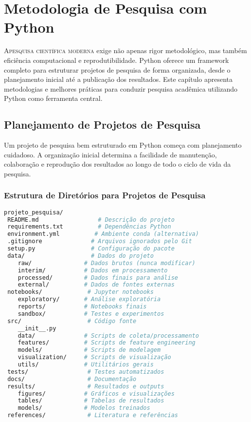 
\chapter{Metodologia de Pesquisa com Python}

\lettrine{A}{pesquisa científica moderna} exige não apenas rigor metodológico, mas também eficiência computacional e reprodutibilidade. Python oferece um framework completo para estruturar projetos de pesquisa de forma organizada, desde o planejamento inicial até a publicação dos resultados. Este capítulo apresenta metodologias e melhores práticas para conduzir pesquisa acadêmica utilizando Python como ferramenta central.

\section{Planejamento de Projetos de Pesquisa}

Um projeto de pesquisa bem estruturado em Python começa com planejamento cuidadoso. A organização inicial determina a facilidade de manutenção, colaboração e reprodução dos resultados ao longo de todo o ciclo de vida da pesquisa.

\subsection{Estrutura de Diretórios para Projetos de Pesquisa}
\begin{pythonbox}
\begin{lstlisting}[language=bash]
projeto_pesquisa/
 README.md                 # Descrição do projeto
 requirements.txt          # Dependências Python
 environment.yml          # Ambiente conda (alternativa)
 .gitignore              # Arquivos ignorados pelo Git
 setup.py                # Configuração do pacote
 data/                   # Dados do projeto
    raw/               # Dados brutos (nunca modificar)
    interim/           # Dados em processamento
    processed/         # Dados finais para análise
    external/          # Dados de fontes externas
 notebooks/             # Jupyter notebooks
    exploratory/       # Análise exploratória
    reports/           # Notebooks finais
    sandbox/           # Testes e experimentos
 src/                   # Código fonte
    __init__.py
    data/              # Scripts de coleta/processamento
    features/          # Scripts de feature engineering
    models/            # Scripts de modelagem
    visualization/     # Scripts de visualização
    utils/             # Utilitários gerais
 tests/                 # Testes automatizados
 docs/                  # Documentação
 results/               # Resultados e outputs
    figures/           # Gráficos e visualizações
    tables/            # Tabelas de resultados
    models/            # Modelos treinados
 references/            # Literatura e referências
\end{lstlisting}
\end{pythonbox}

